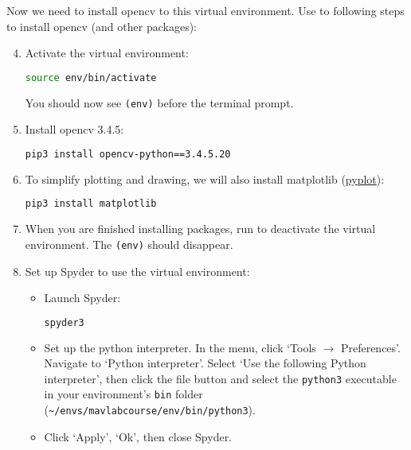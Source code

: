 \documentclass{article}
\begin{document}
Now we need to install opencv to this virtual environment. Use to following steps to install opencv (and other packages):
\begin{enumerate}\setcounter{enumi}{3}
\item Activate the virtual environment:
\begin{lstlisting}[language=bash]
source env/bin/activate
\end{lstlisting}
You should now see \texttt{(env)} before the terminal prompt.
\item Install opencv 3.4.5:
\begin{lstlisting}[language=bash]
pip3 install opencv-python==3.4.5.20
\end{lstlisting}
\item To simplify plotting and drawing, we will also install matplotlib (\href{https://matplotlib.org/api/pyplot_api.html}{pyplot}):
\begin{lstlisting}[language=bash]
pip3 install matplotlib
\end{lstlisting}
\item When you are finished installing packages, run  to deactivate the virtual environment. The \texttt{(env)} should disappear.
\item Set up Spyder to use the virtual environment:
\begin{itemize}
\item Launch Spyder:
\begin{lstlisting}[language=bash]
spyder3
\end{lstlisting}
\item Set up the python interpreter. In the menu, click `Tools $\rightarrow$ Preferences'. Navigate to `Python interpreter'. Select `Use the following Python interpreter', then click the file button and select the \texttt{python3} executable in your environment's \texttt{bin} folder (\verb|~/envs/mavlabcourse/env/bin/python3|).
\item Click `Apply', `Ok', then close Spyder.
\end{itemize}


\end{enumerate}
\end{document}
